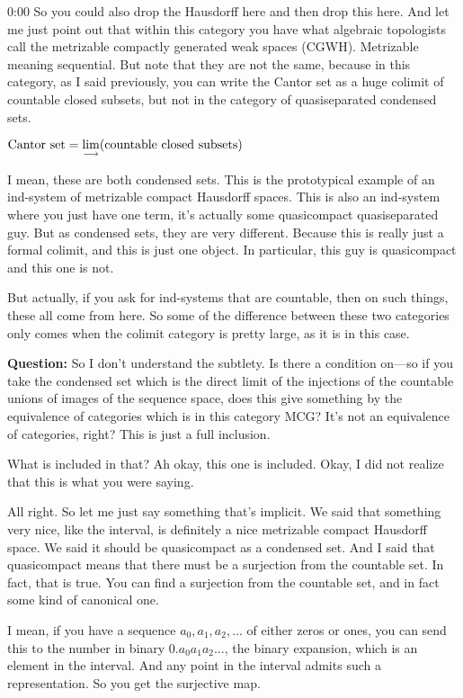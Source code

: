 \begin{unfinished}{0:00}
So you could also drop the Hausdorff here and then drop this here. And let me just point out that within this category you have what algebraic topologists call the metrizable compactly generated weak spaces (CGWH). Metrizable meaning sequential. 
But note that they are not the same, because in this category, as I said previously, you can write the Cantor set as a huge colimit of countable closed subsets, but not in the category of quasiseparated condensed sets.

$\text{Cantor set} = \mathop{\operatorname*{lim}\limits_{\longrightarrow}}\limits (\text{countable closed subsets})$

I mean, these are both condensed sets. This is the prototypical example of an ind-system of metrizable compact Hausdorff spaces. This is also an ind-system where you just have one term, it's actually some quasicompact quasiseparated guy. But as condensed sets, they are very different. 
Because this is really just a formal colimit, and this is just one object. In particular, this guy is quasicompact and this one is not.

But actually, if you ask for ind-systems that are countable, then on such things, these all come from here. So some of the difference between these two categories only comes when the colimit category is pretty large, as it is in this case.

\textbf{Question:} So I don't understand the subtlety. Is there a condition on---so if you take the condensed set which is the direct limit of the injections of the countable unions of images of the sequence space, does this give something by the equivalence of categories which is in this category MCG? It's not an equivalence of categories, right? This is just a full inclusion.

What is included in that? Ah okay, this one is included. Okay, I did not realize that this is what you were saying. 

All right. So let me just say something that's implicit. We said that something very nice, like the interval, is definitely a nice metrizable compact Hausdorff space. We said it should be quasicompact as a condensed set. And I said that quasicompact means that there must be a surjection from the countable set. In fact, that is true. You can find a surjection from the countable set, and in fact some kind of canonical one.

I mean, if you have a sequence $a_0, a_1, a_2, \ldots$ of either zeros or ones, you can send this to the number in binary $0.a_0 a_1 a_2 \ldots$, the binary expansion, which is an element in the interval. And any point in the interval admits such a representation. So you get the surjective map.


\end{unfinished}
